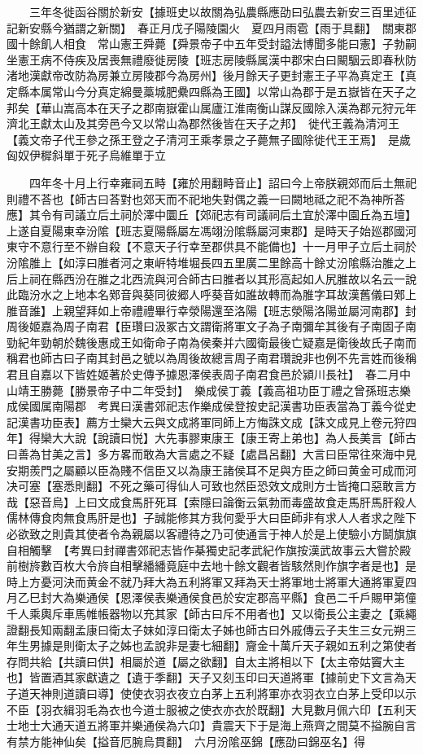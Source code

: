 　　三年冬徙函谷關於新安【據班史以故關為弘農縣應劭曰弘農去新安三百里述征記新安縣今猶謂之新關】　春正月戊子陽陵園火　夏四月雨雹【雨于具翻】　關東郡國十餘飢人相食　常山憲王舜薨【舜景帝子中五年受封謚法博聞多能曰憲】子勃嗣坐憲王病不侍疾及居喪無禮廢徙房陵【班志房陵縣属漢中郡宋白曰闞駰云即春秋防渚地漢獻帝改防為房兼立房陵郡今為房州】後月餘天子更封憲王子平為真定王【真定縣本属常山今分真定綿曼藁城肥纍四縣為王國】以常山為郡于是五嶽皆在天子之邦矣【華山嵩高本在天子之郡南嶽霍山属廬江淮南衡山謀反國除入漢為郡元狩元年濟北王獻太山及其旁邑今又以常山為郡然後皆在天子之邦】　徙代王義為清河王【義文帝子代王參之孫王登之子清河王乘孝景之子薨無子國除徙代王王焉】　是歲匈奴伊穉斜單于死子烏維單于立

　　四年冬十月上行幸雍祠五畤【雍於用翻畤音止】詔曰今上帝朕親郊而后土無祀則禮不荅也【師古曰荅對也郊天而不祀地失對偶之義一曰闕地祗之祀不為神所荅應】其令有司議立后土祠於澤中圜丘【郊祀志有司議祠后土宜於澤中園丘為五壇】上遂自夏陽東幸汾隂【班志夏陽縣屬左馮翊汾隂縣屬河東郡】是時天子始廵郡國河東守不意行至不辦自殺【不意天子行幸至郡供具不能備也】十一月甲子立后土祠於汾隂脽上【如淳曰脽者河之東㟁特堆堀長四五里廣二里餘高十餘丈汾隂縣治脽之上后上祠在縣西汾在脽之北西流與河合師古曰脽者以其形高起如人尻脽故以名云一說此臨汾水之上地本名鄈音與葵同彼郷人呼葵音如誰故轉而為脽字耳故漢舊儀曰鄈上脽音誰】上親望拜如上帝禮禮畢行幸滎陽還至洛陽【班志滎陽洛陽並屬河南郡】封周後姬嘉為周子南君【臣瓚曰汲冢古文謂衛將軍文子為子南彌牟其後有子南固子南勁紀年勁朝於魏後惠成王如衛命子南為侯秦并六國衛最後亡疑嘉是衛後故氏子南而稱君也師古曰子南其封邑之號以為周後故總言周子南君瓚說非也例不先言姓而後稱君且自嘉以下皆姓姬著於史傳予據恩澤侯表周子南君食邑於潁川長社】　春二月中山靖王勝薨【勝景帝子中二年受封】　樂成侯丁義【義高祖功臣丁禮之曾孫班志樂成侯國属南陽郡　考異曰漢書郊祀志作樂成侯登按史記漢書功臣表當為丁義今從史記漢書功臣表】薦方士欒大云與文成將軍同師上方悔誅文成【誅文成見上卷元狩四年】得欒大大說【說讀曰悦】大先事膠東康王【康王寄上弟也】為人長美言【師古曰善為甘美之言】多方畧而敢為大言處之不疑【處昌呂翻】大言曰臣常往來海中見安期羨門之屬顧以臣為賤不信臣又以為康王諸侯耳不足與方臣之師曰黄金可成而河决可塞【塞悉則翻】不死之藥可得仙人可致也然臣恐效文成則方士皆掩口惡敢言方哉【惡音烏】上曰文成食馬肝死耳【索隱曰論衡云氣勃而毒盛故食走馬肝馬肝殺人儒林傳食肉無食馬肝是也】子誠能修其方我何愛乎大曰臣師非有求人人者求之陛下必欲致之則貴其使者令為親屬以客禮待之乃可使通言于神人於是上使驗小方鬬旗旗自相觸擊　【考異曰封禪書郊祀志皆作棊獨史記孝武紀作旗按漢武故事云大嘗於殿前樹旍數百枚大令旍自相擊繙繙竟庭中去地十餘文觀者皆駭然則作旗字者是也】是時上方憂河決而黄金不就乃拜大為五利將軍又拜為天士將軍地士將軍大通將軍夏四月乙巳封大為樂通侯【恩澤侯表樂通侯食邑於安定郡高平縣】食邑二千戶賜甲第僮千人乘輿斥車馬帷帳器物以充其家【師古曰斥不用者也】又以衛長公主妻之【乘繩證翻長知兩翻孟康曰衛太子妹如淳曰衛太子姊也師古曰外戚傳云子夫生三女元朔三年生男據是則衛太子之姊也孟說非是妻七細翻】齎金十萬斤天子親如五利之第使者存問共給【共讀曰供】相屬於道【屬之欲翻】自太主將相以下【太主帝姑竇大主也】皆置酒其家獻遺之【遺于季翻】天子又刻玉印曰天道將軍【據前史下文言為天子道天神則道讀曰導】使使衣羽衣夜立白茅上五利將軍亦衣羽衣立白茅上受印以示不臣【羽衣緝羽毛為衣也今道士服被之使衣亦衣於既翻】大見數月佩六印【五利天士地士大通天道五將軍并樂通侯為六卬】貴震天下于是海上燕齊之間莫不搤腕自言有禁方能神仙矣【搤音厄腕烏貫翻】　六月汾隂巫錦【應劭曰錦巫名】得